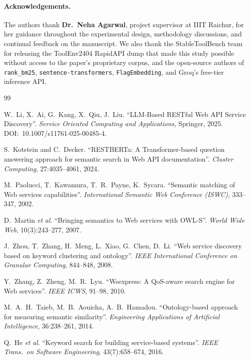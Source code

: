 \documentclass[10pt,a4paper,twocolumn]{article}
\begin{document}
\paragraph{Acknowledgements.} The authors thank
\textbf{Dr.\ Neha Agarwal}, project supervisor at IIIT Raichur,
for her guidance throughout the experimental design, methodology
discussions, and continual feedback on the manuscript. We also
thank the StableToolBench team for releasing the ToolEnv2404
RapidAPI dump that made this study possible without access to the
paper's proprietary corpus, and the open-source authors of
\texttt{rank\_bm25}, \texttt{sentence-transformers},
\texttt{FlagEmbedding}, and Groq's free-tier inference API.

\begin{thebibliography}{99}
\small

W.~Li, X.~Ai, G.~Kang, X.~Qiu, J.~Liu.
``LLM-Based RESTful Web API Service Discovery''.
\textit{Service Oriented Computing and Applications}, Springer,
2025. DOI:~10.1007/s11761-025-00485-4.

S.~Kotstein and C.~Decker.
``RESTBERTa: A Transformer-based question answering approach for
semantic search in Web API documentation''.
\textit{Cluster Computing}, 27:4035--4061, 2024.

M.~Paolucci, T.~Kawamura, T.~R.~Payne, K.~Sycara.
``Semantic matching of Web services capabilities''.
\textit{International Semantic Web Conference (ISWC)}, 333--347,
2002.

D.~Martin \textit{et al.}
``Bringing semantics to Web services with OWL-S''.
\textit{World Wide Web}, 10(3):243--277, 2007.

J.~Zhou, T.~Zhang, H.~Meng, L.~Xiao, G.~Chen, D.~Li.
``Web service discovery based on keyword clustering and ontology''.
\textit{IEEE International Conference on Granular Computing},
844--848, 2008.

Y.~Zhang, Z.~Zheng, M.~R.~Lyu.
``Wsexpress: A QoS-aware search engine for Web services''.
\textit{IEEE ICWS}, 91--98, 2010.

M.~A.~H.~Taieb, M.~B.~Aouicha, A.~B.~Hamadou.
``Ontology-based approach for measuring semantic similarity''.
\textit{Engineering Applications of Artificial Intelligence},
36:238--261, 2014.

Q.~He \textit{et al.}
``Keyword search for building service-based systems''.
\textit{IEEE Trans.\ on Software Engineering}, 43(7):658--674, 2016.


\end{thebibliography}
\end{document}
